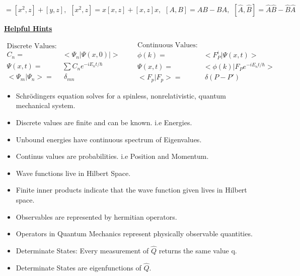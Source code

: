 \documentclass[10pt]{article}
\begin{document}
\begin{equation*}
[x^2+y,z]=[x^2,z]+[y,z],
\hspace{5pt}
[x^2,z]=x[x,z]+[x,z]x,
\hspace{5pt}
[A,B]=AB-BA,
\hspace{5pt}
[\hat{A},\hat{B}]=\hat{A}\hat{B}-\hat{B}\hat{A}
\hspace{5pt}
\end{equation*}
\newpage
\begin{center}
\underline{\textbf{Helpful Hints}}
\end{center}
\begin{multicols}{2}
\begin{equation*}
\begin{split}
\text{Discrete Values:} \\
C_n=&<\Psi_n|\Psi(x,0)|> \\
\Psi(x,t)=&\sum C_ne^{-iE_nt/\hbar} \\
<\Psi_m|\Psi_n>=& \ \delta_{mn}
\end{split}
\hspace{20pt}
\begin{split}
\text{Continuous Values:} \\
\phi(k)=&<F_{P}^{i}|\Psi(x,t)> \\
\Psi(x,t)=&<\phi(k)|F_Pe^{-iE_nt/\hbar}> \\
<F_p|F_p>=& \ \delta(P-P')
\end{split}
\end{equation*}
\end{multicols}
\begin{itemize}
\item{Schr\"odingers equation solves for a spinless, nonrelativistic, quantum mechanical system.}
\item{Discrete values are finite and can be known. i.e Energies.}
\item{Unbound energies have continuous spectrum of Eigenvalues.}
\item{Continus values are probabilities. i.e Position and Momentum.}
\item{Wave functions live in Hilbert Space.}
\item{Finite inner products indicate that the wave function given lives in Hilbert space.}
\item{Observables are represented by hermitian operators.}
\item{Operators in Quantum Mechanics represent physically observable quantities.}
\item{Determinate States: Every measurement of $\hat{Q}$ returns the same value q.}
\item{Determinate States are eigenfunctions of $\hat{Q}$.}
\end{itemize}
\end{document}
